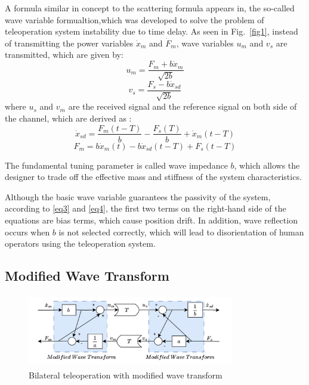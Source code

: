 A formula similar in concept to the scattering formula appears in\cite{b13},
the so-called wave variable formualtion,which was developed to solve the problem of
teleoperation system instability due to time  delay.
As seen in Fig.~\ref{fig1},
instead of transmitting the power variables  $\dot x_m$ and $\dot F_m$,
wave variables  $u_m$ and $v_s$ are transmitted,
which are given by:
\begin{equation}
    u_m = \frac{F_m + b \dot x_m}{\sqrt{2b}}\label{eq1}
\end{equation}
\begin{equation}
    v_s = \frac{F_s - b \dot x_{sd}}{\sqrt{2b}}\label{eq2}
\end{equation}
where $u_s$ and $v_m$ are the received signal
and the reference signal on both side of the channel, which are derived as
:
\begin{equation}
    \dot x_{sd}=\frac{F_m(t-T)}{b}-\frac{F_s(T)}{b}+\dot x_m(t-T)\label{eq3}
\end{equation}
\begin{equation}
    F_{m}=b\dot x_m(t)-b\dot x_{sd}(t-T)+F_s(t-T)\label{eq4}
\end{equation}

The fundamental tuning parameter is called wave impedance $b$,
which allows the designer to trade off the effective mass and
stiffness of the system characteristics.

\par Although the basic wave variable guarantees the passivity of the system\cite{b14},
according to \eqref{eq3} and \eqref{eq4},
the first two terms on the right-hand side of the equations are bias terms, which cause position drift.
In addition, wave reflection occurs when $b$ is not selected correctly\cite{b7},
which will lead to disorientation of human operators using the teleoperation system.

\subsection{Modified Wave Transform}
\begin{figure}[htbp]
    \centerline{\includegraphics[height=3.2cm,width=9cm]{2019.jpg}}
    \caption{Bilateral teleoperation with modified wave transform}
    \label{fig2}
\end{figure}

